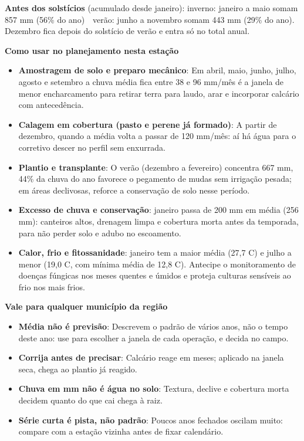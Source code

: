 \documentclass[10pt,a4paper]{article}
\begin{document}
\vspace{1pt}
{\footnotesize\textbf{Antes dos solstícios} (acumulado desde janeiro):
inverno: janeiro a maio somam 857 mm (56\% do ano) \,\textbullet\, verão: junho a novembro somam 443 mm (29\% do ano). Dezembro fica depois do solstício de verão e entra só no total
anual.}

\vspace{2pt}
{\bfseries\small Como usar no planejamento nesta estação}

\footnotesize\begin{itemize}\setlength{\itemsep}{0.5pt}
  \item \textbf{Amostragem de solo e preparo mecânico}: Em abril, maio, junho, julho, agosto e setembro a chuva média fica entre 38 e 96 mm/mês \textemdash{} é a janela de menor encharcamento para retirar terra para laudo, arar e incorporar calcário com antecedência.
  \item \textbf{Calagem em cobertura (pasto e perene já formado)}: A partir de dezembro, quando a média volta a passar de 120 mm/mês: aí há água para o corretivo descer no perfil sem enxurrada.
  \item \textbf{Plantio e transplante}: O verão (dezembro a fevereiro) concentra 667 mm, 44\% da chuva do ano \textemdash{} favorece o pegamento de mudas sem irrigação pesada; em áreas declivosas, reforce a conservação de solo nesse período.
  \item \textbf{Excesso de chuva e conservação}: janeiro passa de 200 mm em média (256 mm): canteiros altos, drenagem limpa e cobertura morta antes da temporada, para não perder solo e adubo no escoamento.
  \item \textbf{Calor, frio e fitossanidade}: janeiro tem a maior média (27,7 \textdegree{}C) e julho a menor (19,0 \textdegree{}C, com mínima média de 12,8 \textdegree{}C). Antecipe o monitoramento de doenças fúngicas nos meses quentes e úmidos e proteja culturas sensíveis ao frio nos mais frios.
\end{itemize}

\vspace{1pt}
{\bfseries\small Vale para qualquer município da região}

\scriptsize\begin{itemize}\setlength{\itemsep}{0.5pt}
  \item \textbf{Média não é previsão}: Descrevem o padrão de vários anos, não o tempo deste ano: use para escolher a janela de cada operação, e decida no campo.
  \item \textbf{Corrija antes de precisar}: Calcário reage em meses; aplicado na janela seca, chega ao plantio já reagido.
  \item \textbf{Chuva em mm não é água no solo}: Textura, declive e cobertura morta decidem quanto do que cai chega à raiz.
  \item \textbf{Série curta é pista, não padrão}: Poucos anos fechados oscilam muito: compare com a estação vizinha antes de fixar calendário.
\end{itemize}
\end{document}

